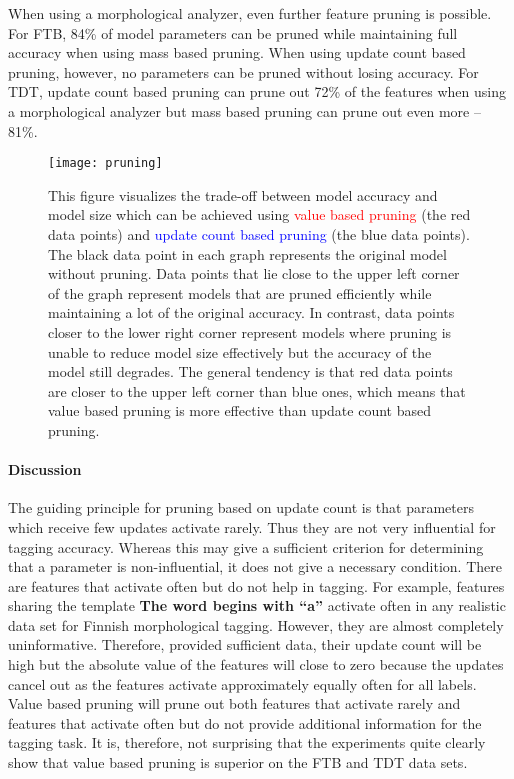 When using a morphological analyzer, even further feature pruning is
possible. For FTB, 84\% of model parameters can be pruned while
maintaining full accuracy when using mass based pruning. When using
update count based pruning, however, no parameters can be pruned
without losing accuracy. For TDT, update count based pruning can prune
out 72\% of the features when using a morphological analyzer but mass
based pruning can prune out even more -- 81\%.

\begin{figure}[htb!]
\begin{center}
\texttt{[image: pruning]}
\end{center}
\caption{This figure visualizes the trade-off between model accuracy
  and model size which can be achieved using {\textcolor{red}{value
      based pruning}} (the red data points) and
  {\textcolor{blue}{update count based pruning}} (the blue data
  points). The black data point in each graph represents the original
  model without pruning. Data points that lie close to the upper
  left corner of the graph represent models that are pruned
  efficiently while maintaining a lot of the original accuracy. In
  contrast, data points closer to the lower right corner represent
  models where pruning is unable to reduce model size effectively but
  the accuracy of the model still degrades. The general tendency is
  that red data points are closer to the upper left corner than blue
  ones, which means that value based pruning is more effective than
  update count based pruning.}\label{fig:pruning-vis}
\end{figure}

\paragraph{Discussion} The guiding principle for pruning based on
update count is that parameters which receive few updates activate
rarely. Thus they are not very influential for tagging
accuracy. Whereas this may give a sufficient criterion for determining
that a parameter is non-influential, it does not give a necessary
condition. There are features that activate often but do not help in
tagging. For example, features sharing the template {\bf The word
  begins with ``a''} activate often in any realistic data set for
Finnish morphological tagging. However, they are almost completely
uninformative. Therefore, provided sufficient data, their update count
will be high but the absolute value of the features will close to zero
because the updates cancel out as the features activate approximately
equally often for all labels. Value based pruning will prune out both
features that activate rarely and features that activate often but do
not provide additional information for the tagging task. It is,
therefore, not surprising that the experiments quite clearly show that
value based pruning is superior on the FTB and TDT data sets.


